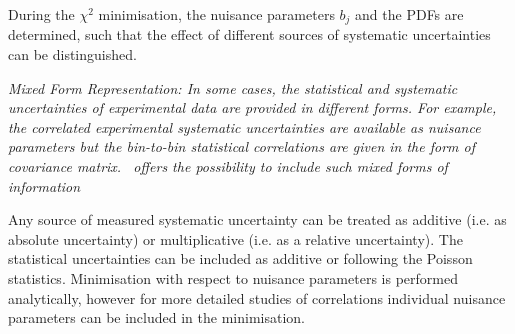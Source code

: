 \begin{description}
During the $\chi^2$ minimisation, the nuisance parameters $b_j$ and the PDFs are determined, such that the effect of different sources of systematic uncertainties can be distinguished.
\item  \it{Mixed Form Representation:} \rm
In some cases, the statistical and systematic uncertainties of experimental data are provided in different forms.    
For example, the correlated experimental systematic uncertainties are available as nuisance parameters
but the bin-to-bin statistical correlations are given in the form of covariance matrix.
\fitter\ offers the possibility to include such mixed forms of information 
\end{description}
Any source of measured systematic uncertainty can be treated as additive (i.e. as absolute uncertainty) or multiplicative (i.e. as a relative uncertainty). 
The statistical uncertainties can be included as additive or following the Poisson statistics. Minimisation
with respect to nuisance parameters is performed analytically, however for more 
detailed studies of correlations individual nuisance parameters can be included in 
the \minuit minimisation.


